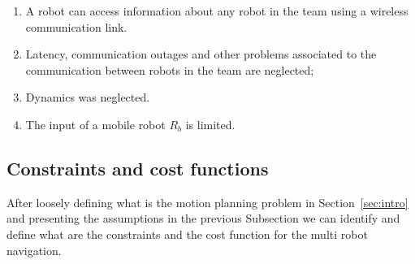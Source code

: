 \documentclass[eprint]{actapoly}
\begin{document}
\begin{enumerate}
    \item A robot can access 
    information about any robot in the team using 
    a wireless communication link.
    
    \item Latency, communication outages and other problems associated
    to the communication between robots in the team are neglected;
        
    \item Dynamics was neglected.
    
    \item The input of a mobile robot $R_b$ is limited.
    

%    

\end{enumerate}

\subsection{Constraints and cost functions}

After loosely defining what is the motion planning problem in
Section~\ref{sec:intro} and presenting the assumptions in the previous Subsection
we can identify and define what are the constraints and the cost function for the
multi robot navigation.
\end{document}
